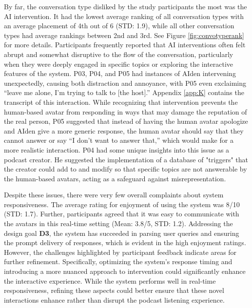 \documentclass[12pt]{report}
\begin{document}
\begin{myfont}
        \indent By far, the conversation type disliked by the study participants the most was the AI intervention. It had the lowest average ranking of all conversation types with an average placement of 4th out of 6 (STD: 1.9), while all other conversation types had average rankings between 2nd and 3rd. See Figure \ref{fig:convotyperank} for more details. Participants frequently reported that AI interventions often felt abrupt and somewhat disruptive to the flow of the conversation, particularly when they were deeply engaged in specific topics or exploring the interactive features of the system. P03, P04, and P05 had instances of AIden intervening unexpectedly, causing both distraction and annoyance, with P05 even exclaiming “leave me alone, I’m trying to talk to [the host].” Appendix \ref{app:K} contains the transcript of this interaction. While recognizing that intervention prevents the human-based avatar from responding in ways that may damage the reputation of the real person, P05 suggested that instead of having the human avatar apologize and AIden give a more generic response, the human avatar should say that they cannot answer or say “I don’t want to answer that,” which would make for a more realistic interaction. P04 had some unique insights into this issue as a podcast creator. He suggested the implementation of a database of "triggers" that the creator could add to and modify so that specific topics are not answerable by the human-based avatars, acting as a safeguard against misrepresentation.
        
        \indent Despite these issues, there were very few overall complaints about system responsiveness. The average rating for enjoyment of using the system was 8/10 (STD: 1.7). Further, participants agreed that it was easy to communicate with the avatars in this real-time setting (Mean: 3.8/5, STD: 1.2). Addressing the design goal \textbf{D3}, the system has succeeded in parsing user queries and ensuring the prompt delivery of responses, which is evident in the high enjoyment ratings. However, the challenges highlighted by participant feedback indicate areas for further refinement. Specifically, optimizing the system's response timing and introducing a more nuanced approach to intervention could significantly enhance the interactive experience. While the system performs well in real-time responsiveness, refining these aspects could better ensure that these novel interactions enhance rather than disrupt the podcast listening experience.


\end{myfont}
\end{document}

